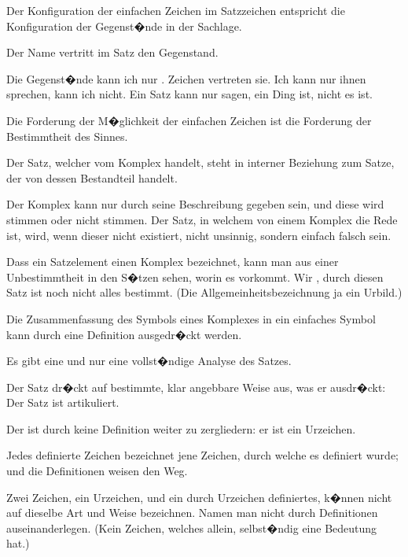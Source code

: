 {Der Konfiguration der einfachen Zeichen im
Satzzeichen entspricht die Konfiguration der Gegenst�nde
in der Sachlage.}


{Der Name vertritt im Satz den Gegenstand.}


{Die Gegenst�nde kann ich nur . Zeichen
vertreten sie. Ich kann nur  ihnen sprechen,
 kann ich nicht. Ein Satz
kann nur sagen,  ein Ding ist, nicht  es ist.}


{Die Forderung der M�glichkeit der einfachen
Zeichen ist die Forderung der Bestimmtheit des
Sinnes.}


{Der Satz, welcher vom Komplex handelt, steht
in interner Beziehung zum Satze, der von dessen
Bestandteil handelt.

Der Komplex kann nur durch seine Beschreibung
gegeben sein, und diese wird stimmen oder
nicht stimmen. Der Satz, in welchem von einem
Komplex die Rede ist, wird, wenn dieser nicht
existiert, nicht unsinnig, sondern einfach falsch sein.

Dass ein Satzelement einen Komplex bezeichnet,
kann man aus einer Unbestimmtheit in den S�tzen
sehen, worin es vorkommt. Wir , durch
diesen Satz ist noch nicht alles bestimmt. (Die
Allgemeinheitsbezeichnung  ja ein Urbild.)

Die Zusammenfassung des Symbols eines Komplexes
in ein einfaches Symbol kann durch eine
\enlargethispage{4pt} %
Definition ausgedr�ckt werden.}


{Es gibt eine und nur eine vollst�ndige Analyse
des Satzes.}


{Der Satz dr�ckt auf bestimmte, klar angebbare
Weise aus, was er ausdr�ckt: Der Satz ist artikuliert.}


{Der  ist durch keine Definition weiter zu
zergliedern: er ist ein Urzeichen.}


{Jedes definierte Zeichen bezeichnet  jene
Zeichen, durch welche es definiert wurde; und die
Definitionen weisen den Weg.

Zwei Zeichen, ein Urzeichen, und ein durch
Urzeichen definiertes, k�nnen nicht auf dieselbe
Art und Weise bezeichnen. Namen  man
nicht durch Definitionen auseinanderlegen. (Kein
Zeichen, welches allein, selbst�ndig eine Bedeutung
hat.)}


